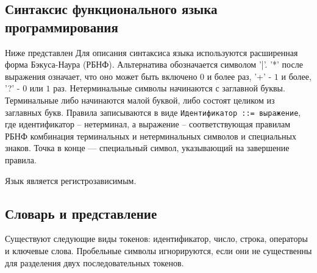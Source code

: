\subsection{Синтаксис функционального языка программирования}
    Ниже представлен 
    Для описания синтаксиса языка используются расширенная форма Бэкуса-Наура (РБНФ). 
    Альтернатива обозначается символом '|'. 
    '*' после выражения означает, что оно может быть включено $0$ и более раз, '+' - $1$ и более, '?' - $0$ или $1$ раз.\cite{skor}
    Нетерминальные символы начинаются с заглавной буквы. 
    Терминальные либо начинаются малой буквой, либо состоят целиком из заглавных букв.
    Правила записываются в виде \verb!Идентификатор ::= выражение!,
    где идентификатор -- нетерминал, а выражение -- соответствующая правилам РБНФ комбинация терминальных и нетерминальных символов и специальных знаков.
    Точка в конце — специальный символ, указывающий на завершение правила.

    Язык является регистрозависимым.

\subsection{Словарь и представление}
    Существуют следующие виды токенов: идентификатор, число, строка, операторы и ключевые слова.
    Пробельные символы игнорируются, если они не существенны для разделения двух последовательных токенов.

